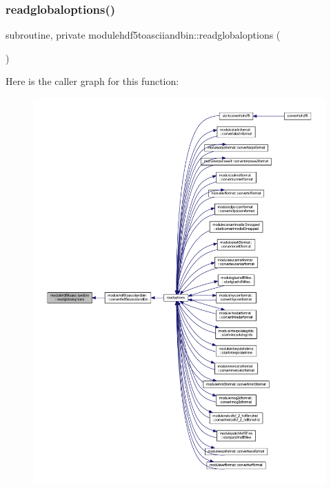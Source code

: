 \subsubsection{\texorpdfstring{readglobaloptions()}{readglobaloptions()}}
{\footnotesize\ttfamily subroutine, private modulehdf5toasciiandbin\+::readglobaloptions (\begin{DoxyParamCaption}{ }\end{DoxyParamCaption})\hspace{0.3cm}{\ttfamily [private]}}

Here is the caller graph for this function\+:\nopagebreak
\begin{figure}[H]
\begin{center}
\leavevmode
\includegraphics[width=350pt]{namespacemodulehdf5toasciiandbin_acdf03424042f9020f63ddb9bd5d39fce_icgraph}
\end{center}
\end{figure}
\mbox{\label{namespacemodulehdf5toasciiandbin_afad7dca87cff93eae4b5e8a18fdbbec3}} 
